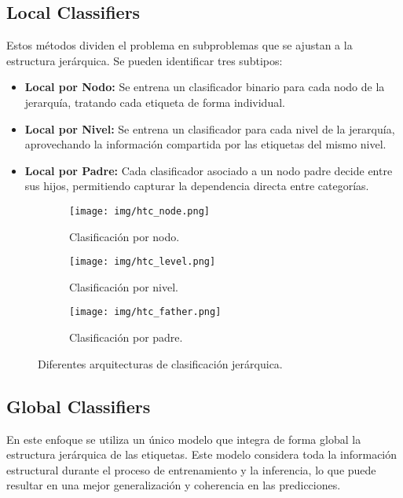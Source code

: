 \documentclass[12pt,letterpaper]{article}
\begin{document}
\subsection{Local Classifiers}
Estos métodos dividen el problema en subproblemas que se ajustan a la estructura jerárquica. Se pueden identificar tres subtipos:
\begin{itemize}
    \item \textbf{Local por Nodo:} Se entrena un clasificador binario para cada nodo de la jerarquía, tratando cada etiqueta de forma individual.
    \item \textbf{Local por Nivel:} Se entrena un clasificador para cada nivel de la jerarquía, aprovechando la información compartida por las etiquetas del mismo nivel.
    \item \textbf{Local por Padre:} Cada clasificador asociado a un nodo padre decide entre sus hijos, permitiendo capturar la dependencia directa entre categorías.
\end{itemize}

\begin{figure}[htp]
    \centering
    \begin{subfigure}[b]{0.3\textwidth}
        \centering
        \texttt{[image: img/htc\_node.png]}
        \caption{Clasificación por nodo.}
        \label{fig:htc_node}
    \end{subfigure}
    \hfill
    \begin{subfigure}[b]{0.3\textwidth}
        \centering
        \texttt{[image: img/htc\_level.png]}
        \caption{Clasificación por nivel.}
        \label{fig:htc_level}
    \end{subfigure}
    \hfill
    \begin{subfigure}[b]{0.3\textwidth}
        \centering
        \texttt{[image: img/htc\_father.png]}
        \caption{Clasificación por padre.}
        \label{fig:htc_father}
    \end{subfigure}
    \caption{Diferentes arquitecturas de clasificación jerárquica.}
    \label{fig:htc_methods}
\end{figure}

\subsection{Global Classifiers}
En este enfoque se utiliza un único modelo que integra de forma global la estructura jerárquica de las etiquetas. Este modelo considera toda la información estructural durante el proceso de entrenamiento y la inferencia, lo que puede resultar en una mejor generalización y coherencia en las predicciones.
\end{document}
